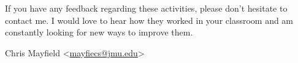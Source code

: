 %

\bigskip

If you have any feedback regarding these activities, please don't hesitate to contact me. I would love to hear how they worked in your classroom and am constantly looking for new ways to improve them.

\bigskip

\newcommand{\email}[1]{<\href{mailto:#1}{#1}>}

Chris Mayfield \email{mayfiecs@jmu.edu}

